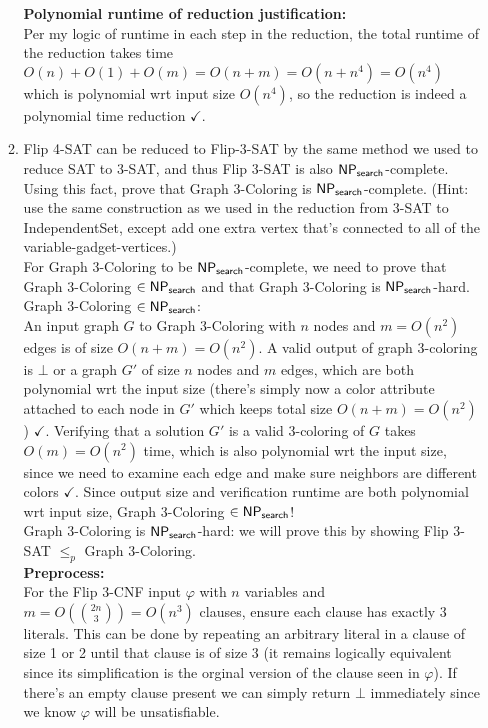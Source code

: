 \documentclass[11pt]{article}
\begin{document}
\begin{enumerate}
\begin{enumerate}
        \textbf{Polynomial runtime of reduction justification:} \\

        Per my logic of runtime in each step in the reduction, the total runtime of the reduction takes time $O(n) + O(1) + O(m) = O(n + m) = O(n+ n^4) = O(n^4)$ which is polynomial wrt input size $O(n^4)$, so the reduction is indeed a polynomial time reduction $\checkmark$. \\

        \item Flip 4-SAT can be reduced to Flip-3-SAT by the same method we used to reduce SAT to 3-SAT, and thus Flip 3-SAT is also $\mathsf{NP_{search}}$-complete.  Using this fact, 
        prove that Graph 3-Coloring is $\mathsf{NP_{search}}$-complete. (Hint: use the same construction as we used in the reduction from 3-SAT to IndependentSet, except add one extra vertex that's connected to all of the variable-gadget-vertices.) \\

        For Graph 3-Coloring to be $\mathsf{NP_{search}}$-complete, we need to prove that Graph 3-Coloring $\in \mathsf{NP_{search}}$ and that Graph 3-Coloring is $\mathsf{NP_{search}}$-hard. \\

        Graph 3-Coloring $\in \mathsf{NP_{search}}$: \\

        An input graph $G$ to Graph 3-Coloring with $n$ nodes and $m = O(n^2)$ edges is of size $O(n+m) = O(n^2)$. A valid output of graph 3-coloring is $\bot$ or a graph $G'$ of size $n$ nodes and $m$ edges, which are both polynomial wrt the input size (there's simply now a color attribute attached to each node in $G'$ which keeps total size $O(n+m) = O(n^2)$) $\checkmark$. Verifying that a solution $G'$ is a valid 3-coloring of $G$ takes $O(m) = O(n^2)$ time, which is also polynomial wrt the input size, since we need to examine each edge and make sure neighbors are different colors $\checkmark$. Since output size and verification runtime are both polynomial wrt input size, Graph 3-Coloring $\in \mathsf{NP_{search}}$! \\

        Graph 3-Coloring is $\mathsf{NP_{search}}$-hard: we will prove this by showing Flip 3-SAT $\leq_p$ Graph 3-Coloring. \\

        \textbf{Preprocess:} \\

        For the Flip 3-CNF input $\varphi$ with $n$ variables and $m = O(\binom{2n}{3}) = O(n^3)$ clauses, ensure each clause has exactly 3 literals. This can be done by repeating an arbitrary literal in a clause of size 1 or 2 until that clause is of size 3 (it remains logically equivalent since its simplification is the orginal version of the clause seen in $\varphi$). If there's an empty clause present we can simply return $\bot$ immediately since we know $\varphi$ will be unsatisfiable. \\
        

\end{enumerate}
\end{enumerate}
\end{document}
